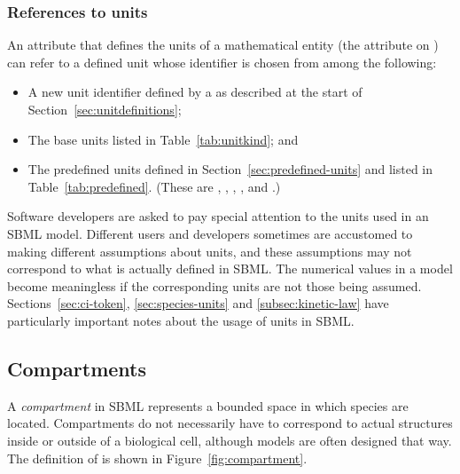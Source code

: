 \subsubsection{References to units}

An attribute that defines the units of a mathematical entity (\eg the
attribute  on \Parameter) can refer to a defined unit
whose identifier is chosen from among the following:
\begin{itemize}
  
\item A new unit identifier defined by a \UnitDefinition as
  described at the start of Section~\ref{sec:unitdefinitions};

\item The base units listed in Table~\vref{tab:unitkind}; and
  
\item The predefined units defined in
  Section~\ref{sec:predefined-units} and listed in
  Table~\ref{tab:predefined}.  (These are ,
  , , , and .)

\end{itemize}

Software developers are asked to pay special attention to the
units used in an SBML model.  Different users and developers
sometimes are accustomed to making different assumptions about
units, and these assumptions may not correspond to what is
actually defined in SBML.  The numerical values in a model become
meaningless if the corresponding units are not those being
assumed.  Sections~\ref{sec:ci-token}, \ref{sec:species-units} and
\ref{subsec:kinetic-law} have particularly important notes about
the usage of units in SBML.

\subsection{Compartments}
\label{sec:compartments}

A \emph{compartment} in SBML represents a bounded space in which
species are located.  Compartments do not necessarily have to
correspond to actual structures inside or outside of a biological
cell, although models are often designed that way.  The definition
of \Compartment is shown in Figure~\vref{fig:compartment}.

